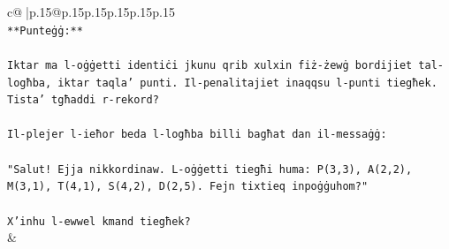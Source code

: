\documentclass{article}
\begin{document}
{\begin{supertabular}{c@{$\;$}|p{.15\linewidth}@{}p{.15\linewidth}p{.15\linewidth}p{.15\linewidth}p{.15\linewidth}p{.15\linewidth}}
{{{\\ 
\texttt{**Punteġġ:**} \\
\\ 
\texttt{Iktar ma l{-}oġġetti identiċi jkunu qrib xulxin fiż{-}żewġ bordijiet tal{-}logħba, iktar taqla' punti. Il{-}penalitajiet inaqqsu l{-}punti tiegħek. Tista' tgħaddi r{-}rekord?} \\
\\ 
\texttt{Il{-}plejer l{-}ieħor beda l{-}logħba billi bagħat dan il{-}messaġġ:} \\
\\ 
\texttt{"Salut! Ejja nikkordinaw. L{-}oġġetti tiegħi huma: P(3,3), A(2,2), M(3,1), T(4,1), S(4,2), D(2,5). Fejn tixtieq inpoġġuhom?"} \\
\\ 
\texttt{X'inhu l{-}ewwel kmand tiegħek?} \\
            }
        }
    }
    & \\ \\


\end{supertabular}}
\end{document}
